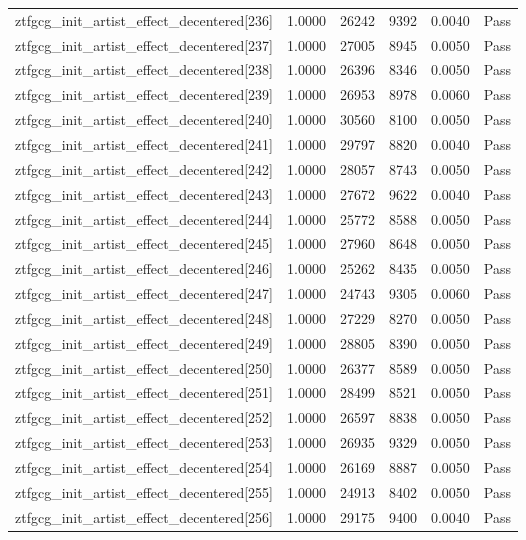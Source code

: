 \begin{table}[htbp]
\begin{tabular}{llrrll}
ztfgcg\_init\_artist\_effect\_decentered[236] & 1.0000 & 26242 & 9392 & 0.0040 & Pass \\
ztfgcg\_init\_artist\_effect\_decentered[237] & 1.0000 & 27005 & 8945 & 0.0050 & Pass \\
ztfgcg\_init\_artist\_effect\_decentered[238] & 1.0000 & 26396 & 8346 & 0.0050 & Pass \\
ztfgcg\_init\_artist\_effect\_decentered[239] & 1.0000 & 26953 & 8978 & 0.0060 & Pass \\
ztfgcg\_init\_artist\_effect\_decentered[240] & 1.0000 & 30560 & 8100 & 0.0050 & Pass \\
ztfgcg\_init\_artist\_effect\_decentered[241] & 1.0000 & 29797 & 8820 & 0.0040 & Pass \\
ztfgcg\_init\_artist\_effect\_decentered[242] & 1.0000 & 28057 & 8743 & 0.0050 & Pass \\
ztfgcg\_init\_artist\_effect\_decentered[243] & 1.0000 & 27672 & 9622 & 0.0040 & Pass \\
ztfgcg\_init\_artist\_effect\_decentered[244] & 1.0000 & 25772 & 8588 & 0.0050 & Pass \\
ztfgcg\_init\_artist\_effect\_decentered[245] & 1.0000 & 27960 & 8648 & 0.0050 & Pass \\
ztfgcg\_init\_artist\_effect\_decentered[246] & 1.0000 & 25262 & 8435 & 0.0050 & Pass \\
ztfgcg\_init\_artist\_effect\_decentered[247] & 1.0000 & 24743 & 9305 & 0.0060 & Pass \\
ztfgcg\_init\_artist\_effect\_decentered[248] & 1.0000 & 27229 & 8270 & 0.0050 & Pass \\
ztfgcg\_init\_artist\_effect\_decentered[249] & 1.0000 & 28805 & 8390 & 0.0050 & Pass \\
ztfgcg\_init\_artist\_effect\_decentered[250] & 1.0000 & 26377 & 8589 & 0.0050 & Pass \\
ztfgcg\_init\_artist\_effect\_decentered[251] & 1.0000 & 28499 & 8521 & 0.0050 & Pass \\
ztfgcg\_init\_artist\_effect\_decentered[252] & 1.0000 & 26597 & 8838 & 0.0050 & Pass \\
ztfgcg\_init\_artist\_effect\_decentered[253] & 1.0000 & 26935 & 9329 & 0.0050 & Pass \\
ztfgcg\_init\_artist\_effect\_decentered[254] & 1.0000 & 26169 & 8887 & 0.0050 & Pass \\
ztfgcg\_init\_artist\_effect\_decentered[255] & 1.0000 & 24913 & 8402 & 0.0050 & Pass \\
ztfgcg\_init\_artist\_effect\_decentered[256] & 1.0000 & 29175 & 9400 & 0.0040 & Pass \\

\end{tabular}
\end{table}
